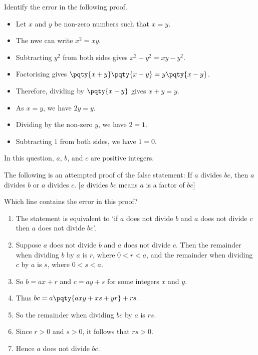 \documentclass{article}
\begin{document}
\begin{example}
    Identify the error in the following proof.

    \begin{itemize}
        \item Let \(x\) and \(y\) be non-zero numbers such that \(x = y\).
        \item The nwe can write \(x^2 = xy\).
        \item Subtracting \(y^2\) from both sides gives \(x^2 - y^2 = xy - y^2\).
        \item Factorising gives \(\pqty{x + y} \pqty{x - y} = y \pqty{x - y}\).
        \item Therefore, dividing by \(\pqty{x - y}\) gives \(x + y = y\).
        \item As \(x = y\), we have \(2y = y\).
        \item Dividing by the non-zero \(y\), we have \(2 = 1\).
        \item Subtracting \(1\) from both sides, we have \(1 = 0\).
    \end{itemize}
\end{example}

\begin{example}[TMUA 2016 P2 Q13]
    In this question, \(a\), \(b\), and \(c\) are positive integers.

    The following is an attempted proof of the false statement: If \(a\) divides \(bc\), then \(a\) divides \(b\) or \(a\) divides \(c\). [\(a\) divides \(bc\) means \(a\) is a factor of \(bc\)]

    Which line contains the error in this proof?

    \begin{enumerate}
        \item The statement is equivalent to `if \(a\) does not divide \(b\) and \(a\) does not divide \(c\) then \(a\) does not divide \(bc\)'.
        \item Suppose \(a\) does not divide \(b\) and \(a\) does not divide \(c\). Then the remainder when dividing \(b\) by \(a\) is \(r\), where \(0 < r < a\), and the remainder when dividing \(c\) by \(a\) is \(s\), where \(0 < s < a\).
        \item So \(b = ax + r\) and \(c = ay + s\) for some integers \(x\) and \(y\).
        \item Thus \(bc = a \pqty{axy + xs + yr} + rs\).
        \item So the remainder when dividing \(bc\) by \(a\) is \(rs\).
        \item Since \(r > 0\) and \(s > 0\), it follows that \(rs > 0\).
        \item Hence \(a\) does not divide \(bc\).
    \end{enumerate}
\end{example}
\end{document}

